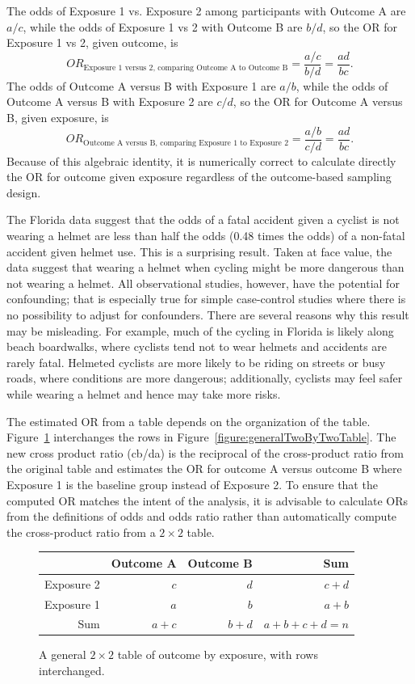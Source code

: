 The odds of Exposure 1 vs. Exposure 2 among participants with Outcome A are $a/c$, while the odds of Exposure 1 vs 2 with Outcome B are $b/d$, so the OR for Exposure 1 vs 2, given outcome, is
\[OR_{\text{Exposure 1 versus 2, comparing Outcome A to Outcome B}} = \dfrac{a/c}{b/d} = \dfrac{ad}{bc}. \]
The odds of Outcome A versus B with Exposure 1 are $a/b$, while the odds of Outcome A versus B with Exposure 2 are $c/d$, so the OR for Outcome A versus B, given exposure, is 
\[OR_{\text{Outcome A versus B, comparing Exposure 1 to Exposure 2}} = \dfrac{a/b}{c/d} = \dfrac{ad}{bc}. \]
Because of this algebraic identity, it is numerically correct to calculate directly the OR for outcome given exposure regardless of the outcome-based sampling design. 

The Florida data suggest that the odds of a fatal accident given a cyclist is not wearing a helmet are less than half the odds (0.48 times the odds) of a non-fatal accident given helmet use. This is a surprising result. Taken at face value, the data suggest that wearing a helmet when cycling might be more dangerous than not wearing a helmet.  All observational studies, however, have the potential for confounding; that is especially true for simple case-control studies where there is no possibility to adjust for confounders.  There are several reasons why this result may be misleading. For example, much of the cycling in Florida is likely along beach boardwalks, where cyclists tend not to wear helmets and accidents are rarely fatal. Helmeted cyclists are more likely to be riding on streets or busy roads, where conditions are more dangerous; additionally, cyclists may feel safer while wearing a helmet and hence may take more risks.

The estimated OR from a table depends on the organization of the table.
Figure~\ref{figure:generalTwoByTwoTableReversed} interchanges the rows in Figure~\ref{figure:generalTwoByTwoTable}.  The new cross product ratio (cb/da) is the reciprocal of the cross-product ratio from the original table and estimates the OR for outcome A versus outcome B where Exposure 1 is the baseline group instead of Exposure 2. To ensure that the computed OR matches the intent of the analysis, it is advisable to calculate ORs from the definitions of odds and odds ratio rather than automatically compute the cross-product ratio from a $2 \times 2$ table. 
   

\begin{figure}[h!]
	\centering
	\begin{tabular}{r|rrr}
		\hline
		& Outcome A & Outcome B & Sum\\ 
		\hline
		Exposure 2 & $c$ & $d$ & $c + d$ \\
		Exposure 1 & $a$ & $b$ & $a + b$ \\ 
		Sum & $a + c$ & $b + d$ & $a + b + c + d = n$ \\
		\hline
	\end{tabular}	
  \caption{A general $2 \times 2$ table of outcome by exposure, with rows interchanged.}
  \label{figure:generalTwoByTwoTableReversed}
  \end{figure}


